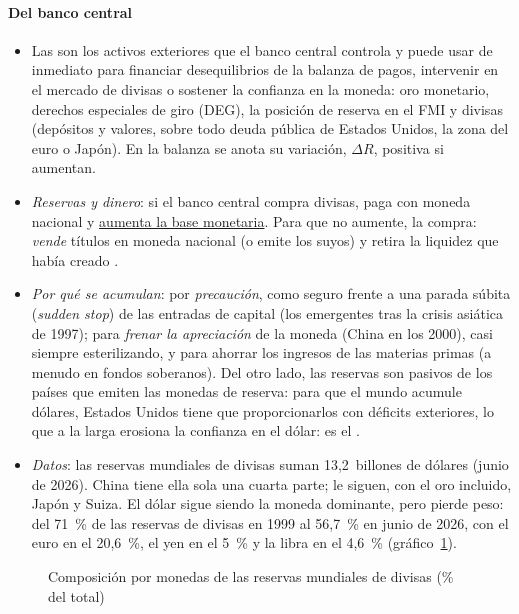 \documentclass[11pt]{article}
\begin{document}
\paragraph{Del banco central}
\begin{itemize}
\item Las  son los activos exteriores que el banco central controla y puede usar de inmediato para financiar desequilibrios de la balanza de pagos, intervenir en el mercado de divisas o sostener la confianza en la moneda\nocite{FMI2009MBP6}: oro monetario, derechos especiales de giro (DEG), la posición de reserva en el FMI y divisas (depósitos y valores, sobre todo deuda pública de Estados Unidos, la zona del euro o Japón). En la balanza se anota su variación, $\Delta R$, positiva si aumentan.
\item \emph{Reservas y dinero}: si el banco central compra divisas, paga con moneda nacional y \uline{aumenta la base monetaria}. Para que no aumente,  la compra: \emph{vende} títulos en moneda nacional (o emite los suyos) y retira la liquidez que había creado .
\item \emph{Por qué se acumulan}: por \emph{precaución}, como seguro frente a una parada súbita (\emph{sudden stop}) de las entradas de capital (los emergentes tras la crisis asiática de 1997); para \emph{frenar la apreciación} de la moneda (China en los 2000), casi siempre esterilizando, y para ahorrar los ingresos de las materias primas (a menudo en fondos soberanos). Del otro lado, las reservas son pasivos de los países que emiten las monedas de reserva: para que el mundo acumule dólares, Estados Unidos tiene que proporcionarlos con déficits exteriores, lo que a la larga erosiona la confianza en el dólar: es el \nocite{Triffin1960}.
\item \emph{Datos}: las reservas mundiales de divisas suman 13,2~billones de dólares (junio de 2026). China tiene ella sola una cuarta parte; le siguen, con el oro incluido, Japón y Suiza\nocite{FMI2026COFER,SAFE2026Reservas2025,BM2026WDIReservas}. El dólar sigue siendo la moneda dominante, pero pierde peso: del 71~\% de las reservas de divisas en 1999 al 56,7~\% en junio de 2026, con el euro en el 20,6~\%, el yen en el 5~\% y la libra en el 4,6~\% (gráfico~\ref{fig:composicion-reservas})\nocite{FMI2026COFER}.
\end{itemize}

\begin{figure}[H]
\centering
\caption{Composición por monedas de las reservas mundiales de divisas (\% del total)}\label{fig:composicion-reservas}
\end{figure}
\end{document}
